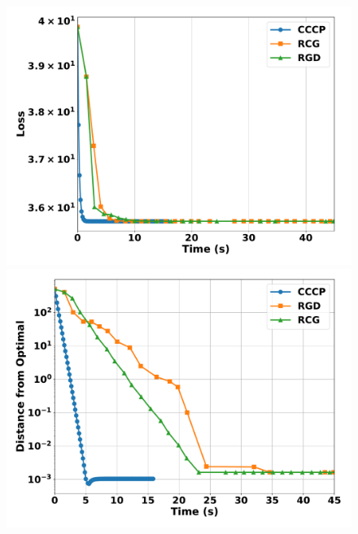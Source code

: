 \documentclass[sn-nature]{sn-jnl}%
\theoremstyle{thmstyleone}%
\theoremstyle{thmstyletwo}%
\theoremstyle{thmstylethree}%
\begin{document}

\begin{figure}[htbp]
  \centering
  \begin{minipage}[b]{0.45\textwidth}
    \centering
    \includegraphics[width=\textwidth]{figuresV2/karcher_mean/loss_time_500_100_medium.pdf}
  \end{minipage}
  \hfill
  \begin{minipage}[b]{0.45\textwidth}
    \centering
    \includegraphics[width=\textwidth]{figuresV2/karcher_mean/distance_time_500_100_medium.pdf}

\end{minipage}
\end{figure}
\end{document}

